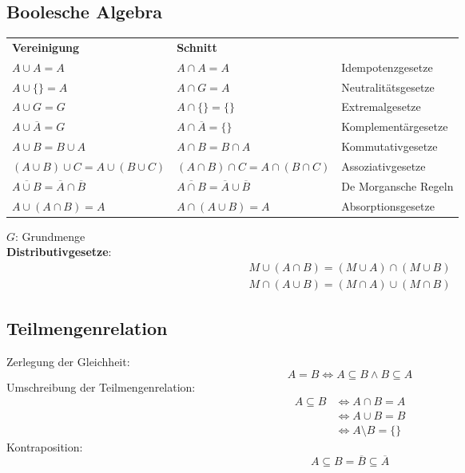 \documentclass[a4paper,10pt,fleqn,onecolumn,twoside]{book}
\numberwithin{equation}{chapter}
\newcommand{\strong}[1]{\textbf{#1}}
\begin{document}
\subsection{Boolesche Algebra}
\begin{tabular}{l|l|l}
\strong{Vereinigung} & \strong{Schnitt} &\\
  $A\cup A = A$
& $A\cap A = A$
& Idempotenzgesetze\\
  $A\cup \{\} = A$
& $A\cap G = A$
& Neutralitätsgesetze\\
  $A\cup G = G$
& $A\cap \{\} = \{\}$
& Extremalgesetze\\
  $A\cup \overline A = G$
& $A\cap \overline A = \{\}$
& Komplementärgesetze\\
\noalign{\vspace{1em}}
  $A\cup B = B\cup A$
& $A\cap B = B\cap A$
& Kommutativgesetze\\
  $(A\cup B)\cup C = A\cup (B\cup C)$
& $(A\cap B)\cap C = A\cap (B\cap C)$
& Assoziativgesetze\\
  $\overline{A\cup B} = \overline A\cap\overline B$
& $\overline{A\cap B} = \overline A\cup\overline B$
& De Morgansche Regeln\\
  $A\cup (A\cap B) = A$
& $A\cap (A\cup B) = A$
& Absorptionsgesetze\\
\end{tabular}
\begin{multicols}{2}
\noindent
$G$: Grundmenge\\

\noindent
\strong{Distributivgesetze}:
\begin{gather}
M\cup (A\cap B) = (M\cup A)\cap (M\cup B)\\
M\cap (A\cup B) = (M\cap A)\cup (M\cap B)
\end{gather}
\subsection{Teilmengenrelation}
Zerlegung der Gleichheit:
\begin{equation}
A=B \iff A\subseteq B \land B\subseteq A
\end{equation}
Umschreibung der Teilmengenrelation:
\begin{equation}
\begin{split}
A\subseteq B &\iff A\cap B=A\\
& \iff A\cup B=B\\
& \iff A\setminus B=\{\}
\end{split}
\end{equation}
Kontraposition:
\begin{equation}
A\subseteq B = \overline B\subseteq \overline A
\end{equation}
\end{multicols}
\end{document}
